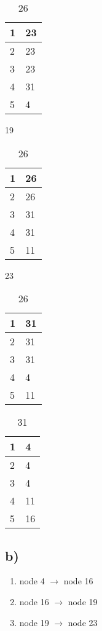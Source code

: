 \documentclass{scrartcl}
\begin{document}
\begin{table}[!htb]
	\begin{minipage}[t]{.33\linewidth}
		\centering
		\begin{tabular}{|l|l|}
			\hline
			1 & 23 \\ \hline
			2 & 23 \\ \hline
			3 & 23 \\ \hline
			4 & 31 \\ \hline
			5 & 4 \\ \hline
		\end{tabular}
		\caption{19}
	\end{minipage}%
	\hfill%
	\begin{minipage}[t]{.33\linewidth}
		\centering
		\begin{tabular}{|l|l|}
			\hline
			1 & 26 \\ \hline
			2 & 26 \\ \hline
			3 & 31 \\ \hline
			4 & 31 \\ \hline
			5 & 11 \\ \hline
		\end{tabular}
		\caption{23}
	\end{minipage}%
	\hfill%
	\begin{minipage}[t]{.33\linewidth}
		\centering
		\begin{tabular}{|l|l|}
			\hline
			1 & 31 \\ \hline
			2 & 31 \\ \hline
			3 & 31 \\ \hline
			4 & 4 \\ \hline
			5 & 11 \\ \hline
		\end{tabular}
		\caption{26}
	\end{minipage}
\end{table}

\begin{table}[!ht]
	\centering
	\begin{tabular}{|l|l|}
		\hline
		1 & 4 \\ \hline
		2 & 4 \\ \hline
		3 & 4 \\ \hline
		4 & 11 \\ \hline
		5 & 16 \\ \hline
	\end{tabular}
	\caption{31}
\end{table}
\subsection*{b)}
\begin{enumerate}
	\item node 4 $ \rightarrow $ node 16
	\item node 16 $ \rightarrow $ node 19
	\item node 19 $ \rightarrow $ node 23
\end{enumerate}
\end{document}
